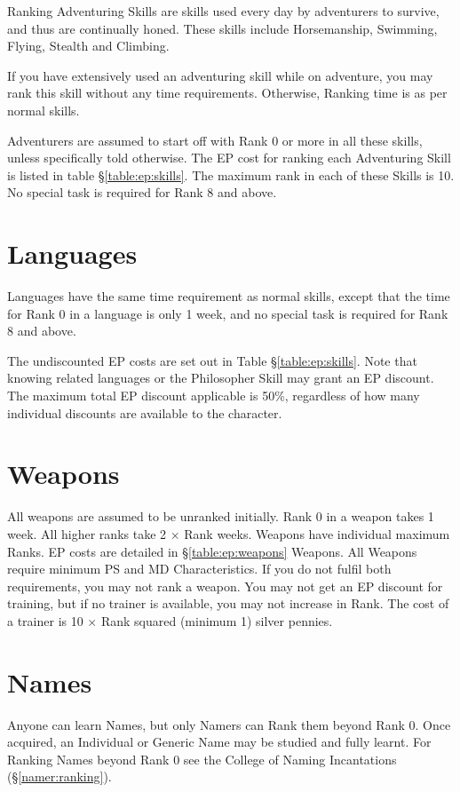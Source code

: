 \begin{Chapter}{Ranking}
Adventuring Skills are skills used every day by adventurers to
survive, and thus are continually honed.  These skills include
Horsemanship, Swimming, Flying, Stealth and Climbing.

If you have extensively used an adventuring skill while on adventure,
you may rank this skill without any time requirements. Otherwise,
Ranking time is as per normal skills.

Adventurers are assumed to start off with Rank 0 or more in all these
skills, unless specifically told otherwise. The EP cost for ranking
each Adventuring Skill is listed in table \S\ref{table:ep:skills}.
The maximum rank in each of these Skills is 10. No special task is
required for Rank 8 and above.

\section{Languages}

Languages have the same time requirement as normal skills, except that
the time for Rank 0 in a language is only 1 week, and no special task
is required for Rank 8 and above.

The undiscounted EP costs are set out in Table
\S\ref{table:ep:skills}.  Note that knowing related languages or the
Philosopher Skill may grant an EP discount.  The maximum total EP
discount applicable is 50\%, regardless of how many individual
discounts are available to the character.

\section{Weapons}

All weapons are assumed to be unranked initially.  Rank 0 in a weapon
takes 1 week. All higher ranks take 2 × Rank weeks.  Weapons have
individual maximum Ranks.  EP costs are detailed in
\S\ref{table:ep:weapons} Weapons.  All Weapons require minimum PS and
MD Characteristics.  If you do not fulfil both requirements, you may
not rank a weapon. You may not get an EP discount for training, but if
no trainer is available, you may not increase in Rank.  The cost of a
trainer is 10 × Rank squared (minimum 1) silver pennies.

\section{Names}
\label{ranking:names}
Anyone can learn Names, but only Namers can Rank them beyond Rank 0.
Once acquired, an Individual or Generic Name may be studied and fully
learnt.  For Ranking Names beyond Rank 0 see the College of Naming
Incantations (\S\ref{namer:ranking}).


\end{Chapter}
